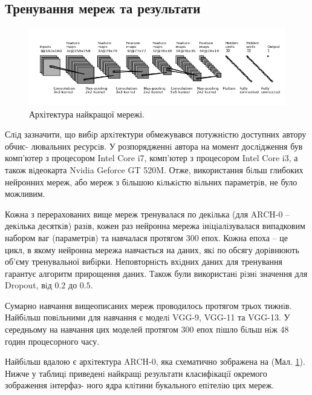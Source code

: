 \subsection{Тренування мереж та результати}

\begin{figure}[t!]
	\includegraphics[width=\linewidth]{Figures/Chapter4/best_model.png}
	\caption{Архітектура найкращої мережі.}
	\label{fig:best_model}
\end{figure}

Слiд зазначити, що вибiр архiтектури обмежувався потужнiстю доступних автору обчис- лювальних ресурсiв. У розпорядженнi автора на момент дослiдження був комп'ютер з процесором Intel Core i7, комп'ютер з процесором Intel Core i3, а також вiдеокарта Nvidia Geforce GT 520M. Отже, використання бiльш глибоких нейронних мереж, або мереж з бiльшою кiлькiстю вiльних параметрiв, не було можливим.

Кожна з перерахованих вище мереж тренувалася по декiлька (для ARCH-0 -- декiлька десяткiв) разiв, кожен раз нейронна мережа iнiцiалiзувалася випадковим набором ваг (параметрiв) та навчалася протягом 300 епох. Кожна епоха -- це цикл, в якому нейронна мережа навчається на даних, якi по обсягу дорiвнюють об'єму тренувальної вибiрки. Неповторнiсть вхiдних даних для тренування гарантує алгоритм прирощення даних. Також були використанi рiзнi значення для Dropout, вiд \(0.2\) до \(0.5\).

Сумарно навчання вищеописаних мереж проводилось протягом трьох тижнiв. Найбiльш повiльними для навчання є моделi VGG-9, VGG-11 та VGG-13. У середньому на навчання цих моделей протягом 300 епох пiшло бiльш нiж 48 годин процесорного часу.

Найбiльш вдалою є архiтектура ARCH-0, яка схематично зображена на (Мал. \ref{fig:best_model}). Нижче у таблицi приведенi найкращi результати класифiкацiї окремого зображення iнтерфаз- ного ядра клiтини букального епiтелiю цих мереж.

